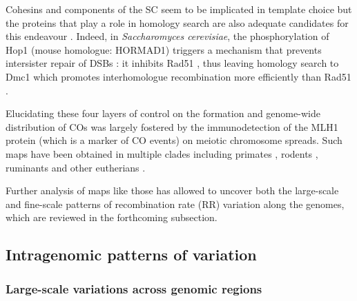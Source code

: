 Cohesins and components of the SC seem to be implicated in template choice \citep[reviewed in \citealp{pradillo2011template}]{couteau2004component,kim2010sister} but the proteins that play a role in homology search are also adequate candidates for this endeavour \citep[reviewed in][]{youds2011choice}.
Indeed, in \textit{Saccharomyces cerevisiae}, the phosphorylation of Hop1 (mouse homologue: HORMAD1) triggers a mechanism that prevents intersister repair of DSBs \citep{niu2005partner}: it inhibits Rad51 \citep{niu2009regulation}, thus leaving homology search to Dmc1 which promotes interhomologue recombination more efficiently than Rad51 \citep{schwacha1997interhomolog}.

Elucidating these four layers of control on the formation and genome-wide distribution of COs was largely fostered by the immunodetection of the MLH1 protein (which is a marker of CO events) on meiotic chromosome spreads. Such maps have been obtained in multiple clades including primates \citep[e.g.][]{sun2005variation,codina-pascual2006crossover,garcia-cruz2011comparative,gruhn2013cytological,munoz-fuentes2015strong}, rodents \citep[e.g.][]{froenicke2002male,dumont2011genetic}, ruminants \citep[e.g.][]{vozdova2013comparative,sebestova2016effect} and other eutherians \citep[e.g.][reviewed in \citealp{capilla2016mammalian}]{borodin2008recombination,segura2013evolution,mary2014meiotic}.

Further analysis of maps like those has allowed to uncover both the large-scale and fine-scale patterns of recombination rate (RR) variation along the genomes, which are reviewed in the forthcoming subsection.




\subsection{Intragenomic patterns of variation}
\subsubsection{Large-scale variations across genomic regions}

